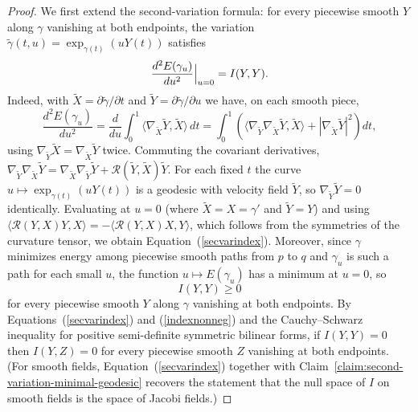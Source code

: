 \begin{proof}
We first extend the second-variation formula: for every piecewise
smooth $Y$ along $\gamma$ vanishing at both endpoints, the variation
$\tilde\gamma(t,u)=\exp_{\gamma(t)}(uY(t))$ satisfies
\begin{equation}\label{secvarindex}
\frac{d^2E(\gamma_u)}{du^2}\Bigl|_{u=0}\Bigr.=I(Y,Y).
\end{equation}
Indeed, with $\widetilde X=\partial\tilde\gamma/\partial t$ and
$\widetilde Y=\partial\tilde\gamma/\partial u$ we have, on each
smooth piece,
$$\frac{d^2E(\gamma_u)}{du^2}
=\frac{d}{du}\int_0^1\langle\nabla_{\widetilde X}\widetilde
Y,\widetilde X\rangle\,dt
=\int_0^1\left(\langle\nabla_{\widetilde Y}\nabla_{\widetilde
X}\widetilde Y,\widetilde X\rangle
+|\nabla_{\widetilde X}\widetilde Y|^2\right)dt,$$
using $\nabla_{\widetilde Y}\widetilde X=\nabla_{\widetilde
X}\widetilde Y$ twice. Commuting the covariant derivatives,
$\nabla_{\widetilde Y}\nabla_{\widetilde X}\widetilde
Y=\nabla_{\widetilde X}\nabla_{\widetilde Y}\widetilde Y+{\mathcal
R}(\widetilde Y,\widetilde X)\widetilde Y$. For each fixed $t$ the
curve $u\mapsto\exp_{\gamma(t)}(uY(t))$ is a geodesic with velocity
field $\widetilde Y$, so $\nabla_{\widetilde Y}\widetilde Y=0$
identically. Evaluating at $u=0$ (where $\widetilde X=X=\gamma'$ and
$\widetilde Y=Y$) and using
$\langle{\mathcal R}(Y,X)Y,X\rangle=-\langle{\mathcal
R}(Y,X)X,Y\rangle$, which follows from the symmetries of the
curvature tensor, we obtain
Equation~(\ref{secvarindex}). Moreover, since $\gamma$ minimizes
energy among piecewise smooth paths from $p$ to $q$ and
$\gamma_u$ is such a path for each small $u$, the function
$u\mapsto E(\gamma_u)$ has a minimum at $u=0$, so
\begin{equation}\label{indexnonneg}
I(Y,Y)\ge 0
\end{equation}
for every piecewise smooth $Y$ along $\gamma$ vanishing at both
endpoints. By Equations~(\ref{secvarindex}) and
(\ref{indexnonneg}) and the Cauchy--Schwarz inequality for
positive semi-definite symmetric bilinear forms, if $I(Y,Y)=0$ then
$I(Y,Z)=0$ for every piecewise smooth $Z$ vanishing at both
endpoints. (For smooth fields, Equation~(\ref{secvarindex})
together with
Claim~\ref{claim:second-variation-minimal-geodesic} recovers the
statement that the null space of $I$ on smooth fields is the space
of Jacobi fields.)


\end{proof}
